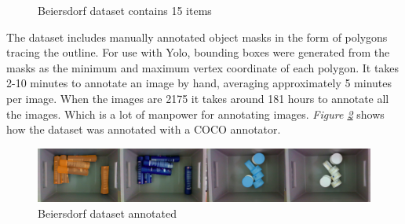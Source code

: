 \begin{figure}[h]
 \hfill
 \hfill
 \hfill
 \hfill
 \hfill
 \hfill
 \caption{Beiersdorf dataset contains 15 items\cite{bjarnason_detecting_2021}}
 \label{fig:beiersdorf}
\end{figure}

The dataset includes manually annotated object masks in the form of polygons tracing the outline. For use with Yolo, bounding boxes were generated from the masks as the minimum and maximum vertex coordinate of each polygon.
It takes 2-10 minutes to annotate an image by hand, averaging approximately 5 minutes per image. When the images are 2175 it takes around 181 hours to annotate all the images. Which is a lot of manpower for annotating images. \textit{Figure \ref{fig:beiersdorfanno}} shows how the dataset was annotated with a COCO annotator\cite{brooks_jsbrokscoco-annotator_2021}.
\begin{figure}[h]
 \centering
 \includegraphics[width=1\textwidth, angle =0]{graphics/methods/sverrirannotated.PNG}
 \caption{Beiersdorf dataset annotated\cite{bjarnason_detecting_2021}}
 \label{fig:beiersdorfanno}
\end{figure}

